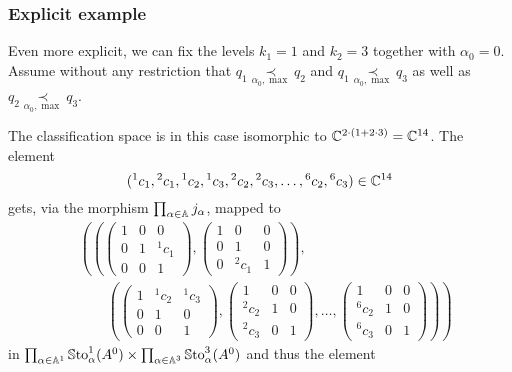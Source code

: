 \subsubsection{Explicit example}
\def\kOne{1}
\def\kTwo{3}
\def\zkOnepzKtwo{14} %
\def\zkOne{2} %
\def\zkTwo{6} %

Even more explicit, we can fix the levels $k_1=\kOne$ and $k_2=\kTwo$ together
with $\alpha_0=0$.
Assume without any restriction that $q_1 \underset{\alpha_0,\max}{\prec} q_2$
and $q_1 \underset{\alpha_0,\max}{\prec} q_3$ as well as
$q_2 \underset{\alpha_0,\max}{\prec} q_3$.

The classification space is in this case isomorphic to
$\C^{2\cdot(\kOne+2\cdot\kTwo)}=\C^{\zkOnepzKtwo}$.
The element
\[
  ({}^1c_1,{}^2c_1,
  {}^1c_2,{}^1c_3,{}^2c_2,{}^2c_3,\dots,{}^{\zkTwo}c_2,{}^{\zkTwo}c_3)
  \in\C^{\zkOnepzKtwo}
\]
gets, via the morphism $\prod_{\alpha\in\mathbb{A}}j_\alpha$, mapped to
\begin{align*}
  &\left(
  \left(
    \begin{pmatrix} 1 & 0 & 0 \\0 & 1 & {}^1c_1 \\0 & 0 & 1 \end{pmatrix},
    \begin{pmatrix} 1 & 0 & 0 \\0 & 1 & 0 \\0 & {}^2c_1 & 1 \end{pmatrix}
  \right),
  \right.
\\&\qquad\left(
  \left.
    \begin{pmatrix} 1 & {}^1c_2 & {}^1c_3 \\0 & 1 & 0 \\0 & 0 & 1 \end{pmatrix},
    \begin{pmatrix} 1 & 0 & 0 \\{}^2c_2 & 1 & 0 \\{}^2c_3 & 0 & 1 \end{pmatrix},
    \dots,
    \begin{pmatrix} 1 & 0 & 0 \\{}^{\zkTwo}c_2 & 1 & 0 \\{}^{\zkTwo}c_3 & 0 & 1 \end{pmatrix}
  \right)
  \right)
\end{align*}
in $\prod_{\alpha\in\A^{\kOne}}\SSto_{\alpha}^{\kOne}(A^0) \times
\prod_{\alpha\in\A^{\kTwo}}\SSto_{\alpha}^{\kTwo}(A^0)$ and thus the element
